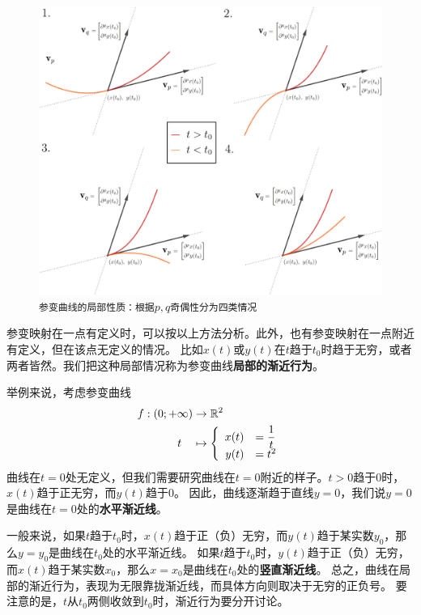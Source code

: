 \documentclass[12pt,UTF8]{ctexbook}
\theoremstyle{definition}
\theoremstyle{plain}
\begin{document}
\begin{figure}[h] 
    \centering
    \includegraphics[width=\textwidth]{tu/参数曲线局部展开1.png}
    \caption*{\texttt{参变曲线的局部性质：根据$p,q$奇偶性分为四类情况}}
\end{figure}

参变映射在一点有定义时，可以按以上方法分析。此外，也有参变映射在一点附近有定义，但在该点无定义的情况。
比如$x(t)$或$y(t)$在$t$趋于$t_0$时趋于无穷，或者两者皆然。我们把这种局部情况称为参变曲线\textbf{局部的渐近行为}。

举例来说，考虑参变曲线
\begin{align*}
    f: (0; +\infty) &\rightarrow \mathbb{R}^2 \\
    t\quad &\mapsto\left\{
        \begin{array}[]{rl}
            x(t) &\displaystyle = \frac{1}{t} \\
            y(t) &= t^2\\
        \end{array}
    \right.
\end{align*}
曲线在$t=0$处无定义，但我们需要研究曲线在$t=0$附近的样子。$t>0$趋于$0$时，$x(t)$趋于正无穷，而$y(t)$趋于$0$。
因此，曲线逐渐趋于直线$y = 0$，我们说$y = 0$是曲线在$t=0$处的\textbf{水平渐近线}。

一般来说，如果$t$趋于$t_0$时，$x(t)$趋于正（负）无穷，而$y(t)$趋于某实数$y_0$，那么$y = y_0$是曲线在$t_0$处的水平渐近线。
如果$t$趋于$t_0$时，$y(t)$趋于正（负）无穷，而$x(t)$趋于某实数$x_0$，那么$x = x_0$是曲线在$t_0$处的\textbf{竖直渐近线}。
总之，曲线在局部的渐近行为，表现为无限靠拢渐近线，而具体方向则取决于无穷的正负号。
要注意的是，$t$从$t_0$两侧收敛到$t_0$时，渐近行为要分开讨论。
\end{document}

